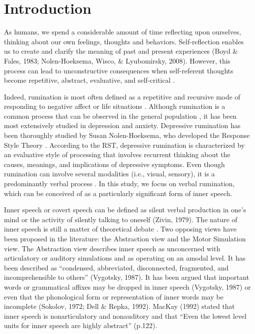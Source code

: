\documentclass[a4paper,11pt,oneside,oldfontcommands]{memoir}
\begin{document}
\section{Introduction}\label{introduction}

As humans, we spend a considerable amount of time reflecting upon
ourselves, thinking about our own feelings, thoughts and behaviors.
Self-reflection enables us to create and clarify the meaning of past and
present experiences (Boyd \& Fales, 1983; Nolen-Hoeksema, Wisco, \&
Lyubomirsky, 2008). However, this process can lead to unconstructive
consequences when self-referent thoughts become repetitive, abstract,
evaluative, and self-critical \citep{Watkins2008}.

Indeed, rumination is most often defined as a repetitive and recursive
mode of responding to negative affect \citep{Rippere1977} or life
situations \citep{Robinson2003}. Although rumination is a common process
that can be observed in the general population \citep{Watkins2008}, it
has been most extensively studied in depression and anxiety. Depressive
rumination has been thoroughly studied by Susan Nolen-Hoeksema, who
developed the Response Style Theory
\citep[RST,][]{nolen-hoeksema_responses_1991}. According to the RST,
depressive rumination is characterized by an evaluative style of
processing that involves recurrent thinking about the causes, meanings,
and implications of depressive symptoms. Even though rumination can
involve several modalities (i.e., visual, sensory), it is a
predominantly verbal process
\citep{goldwin_concreteness_2012, mclaughlin_effects_2007}. In this
study, we focus on verbal rumination, which can be conceived of as a
particularly significant form of inner speech.

Inner speech or covert speech can be defined as silent verbal production
in one's mind or the activity of silently talking to oneself (Zivin,
1979). The nature of inner speech is still a matter of theoretical
debate \citep[see][ for a review]{Perrone-Bertolotti2014}. Two opposing
views have been proposed in the literature: the Abstraction view and the
Motor Simulation view. The Abstraction view describes inner speech as
unconcerned with articulatory or auditory simulations and as operating
on an amodal level. It has been described as ``condensed, abbreviated,
disconnected, fragmented, and incomprehensible to others'' (Vygotsky,
1987). It has been argued that important words or grammatical affixes
may be dropped in inner speech (Vygotsky, 1987) or even that the
phonological form or representation of inner words may be incomplete
(Sokolov, 1972; Dell \& Repka, 1992). MacKay (1992) stated that inner
speech is nonarticulatory and nonauditory and that ``Even the lowest
level units for inner speech are highly abstract'' (p.122).
\end{document}
